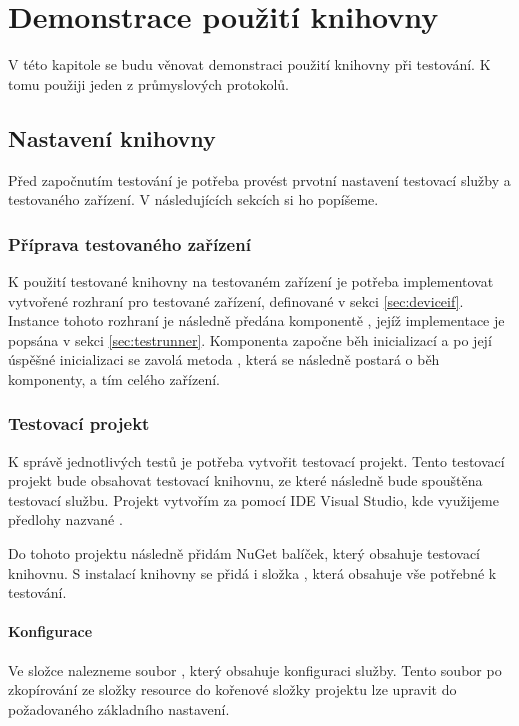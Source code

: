 \chapter{Demonstrace použití knihovny}\label{chap:demonstration}

V této kapitole se budu věnovat demonstraci použití knihovny při testování. K tomu použiji jeden z průmyslových protokolů. 

\section{Nastavení knihovny}
Před započnutím testování je potřeba provést prvotní nastavení testovací služby a testovaného zařízení. V následujících sekcích si ho popíšeme.

\subsection{Příprava testovaného zařízení}
K použití testované knihovny na testovaném zařízení je potřeba implementovat vytvořené rozhraní pro testované zařízení, definované v sekci \ref{sec:deviceif}. Instance tohoto rozhraní je následně předána komponentě , jejíž implementace je popsána v sekci \ref{sec:testrunner}. Komponenta  započne běh inicializací a po její úspěšné inicializaci se zavolá metoda , která se následně postará o běh komponenty, a tím celého zařízení.

\subsection{Testovací projekt}
K správě jednotlivých testů je potřeba vytvořit testovací projekt. Tento testovací projekt bude obsahovat testovací knihovnu, ze které následně bude spouštěna testovací službu. Projekt vytvořím za pomocí IDE Visual Studio, kde využijeme předlohy nazvané . 

Do tohoto projektu následně přidám NuGet balíček, který obsahuje testovací knihovnu. S instalací knihovny se přidá i složka , která obsahuje vše potřebné k testování.

\subsubsection{Konfigurace}
Ve složce  nalezneme soubor , který obsahuje konfiguraci služby. Tento soubor po zkopírování ze složky resource do kořenové složky projektu lze upravit do požadovaného základního nastavení. 

